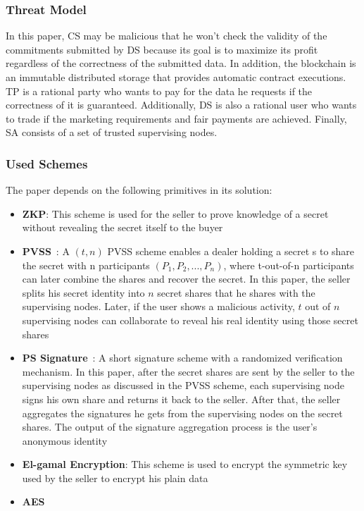 \subsubsection{Threat Model}

In this paper, CS may be malicious that he won't check the validity of the commitments submitted by DS because its goal is to maximize its profit regardless of the correctness of the submitted data.
In addition, the blockchain is an immutable distributed storage that provides automatic contract executions.
TP is a rational party who wants to pay for the data he requests if the correctness of it is guaranteed.
Additionally, DS is also a rational user who wants to trade if the marketing requirements and fair payments are achieved.
Finally, SA consists of a set of trusted supervising nodes.

\subsubsection{Used Schemes}
The paper depends on the following primitives in its solution:

\begin{itemize}
    \item \textbf{ZKP}: This scheme is used for the seller to prove knowledge of a secret without revealing the secret itself to the buyer
    \item \textbf{PVSS}~\cite{schoenmakers1999simple}: A $(t,n)$ PVSS scheme enables a dealer holding a secret s to share the secret with n participants $(P_1, P_2, ..., P_n)$, where t-out-of-n participants can later combine the shares and recover the secret. In this paper, the seller splits his secret identity into $n$ secret shares that he shares with the supervising nodes. Later, if the user shows a malicious activity, $t$ out of $n$ supervising nodes can collaborate to reveal his real identity using those secret shares
    \item \textbf{PS Signature}~\cite{pointcheval2018reassessing}: A short signature scheme with a randomized verification mechanism. In this paper, after the secret shares are sent by the seller to the supervising nodes as discussed in the PVSS scheme, each supervising node signs his own share and returns it back to the seller. After that, the seller aggregates the signatures he gets from the supervising nodes on the secret shares. The output of the signature aggregation process is the user's anonymous identity
    \item \textbf{El-gamal Encryption}: This scheme is used to encrypt the symmetric key used by the seller to encrypt his plain data
    \item \textbf{AES}
\end{itemize}

